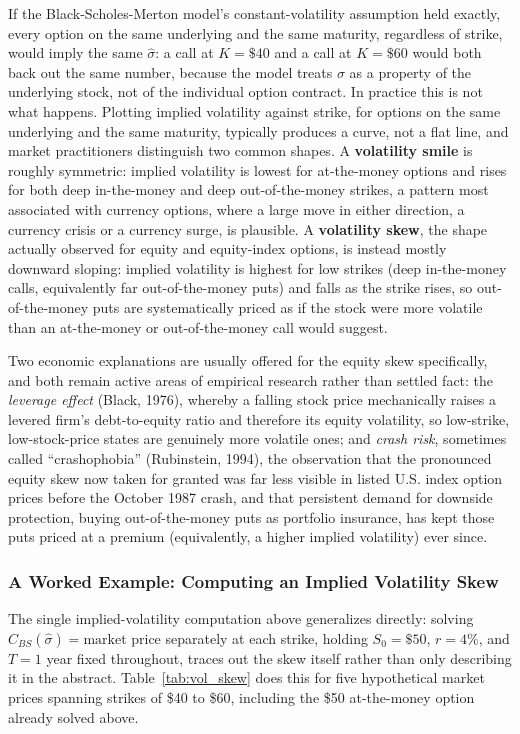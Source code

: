 \documentclass[../ai_in_finance]{subfiles}
\begin{document}
If the Black-Scholes-Merton model's constant-volatility assumption held exactly, every option on the same underlying and the same maturity,
regardless of strike, would imply the same $\hat\sigma$: a call at $K=\$40$ and a call at $K=\$60$ would both back out the same number, because
the model treats $\sigma$ as a property of the underlying stock, not of the individual option contract. In practice this is not what happens.
Plotting implied volatility against strike, for options on the same underlying and the same maturity, typically produces a curve, not a flat line,
and market practitioners distinguish two common shapes. A \textbf{volatility smile} is roughly symmetric: implied volatility is
lowest for at-the-money options and rises for both deep in-the-money and deep out-of-the-money strikes, a pattern most associated with currency options,
where a large move in either direction, a currency crisis or a currency surge, is plausible. A \textbf{volatility skew}, the
shape actually observed for equity and equity-index options, is instead mostly downward sloping: implied volatility is highest for low strikes
(deep in-the-money calls, equivalently far out-of-the-money puts) and falls as the strike rises, so out-of-the-money puts are systematically
priced as if the stock were more volatile than an at-the-money or out-of-the-money call would suggest.

Two economic explanations are usually
offered for the equity skew specifically, and both remain active areas of empirical research rather than settled fact: the \emph{leverage effect} (Black, 1976), whereby a falling stock price mechanically raises a levered firm's debt-to-equity ratio and therefore its equity volatility, so low-strike, low-stock-price states are genuinely more volatile ones; and \emph{crash risk}, sometimes called ``crashophobia'' (Rubinstein, 1994), the observation that the pronounced equity skew now taken for granted was far less visible in listed U.S. index option prices before the October 1987 crash, and that persistent demand for downside protection, buying out-of-the-money puts as portfolio insurance, has kept those puts priced at a premium (equivalently, a higher implied volatility) ever since.

\subsubsection*{A Worked Example: Computing an Implied Volatility Skew}

The single implied-volatility computation above generalizes directly: solving $C_{BS}(\hat\sigma) = \text{market price}$ separately at each strike, holding $S_0=\$50$, $r=4\%$, and $T=1$ year fixed throughout, traces out the skew itself rather than only describing it in the abstract. Table~\ref{tab:vol_skew} does this for five hypothetical market prices spanning strikes of \$40 to \$60, including the \$50 at-the-money option already solved above.
\end{document}
